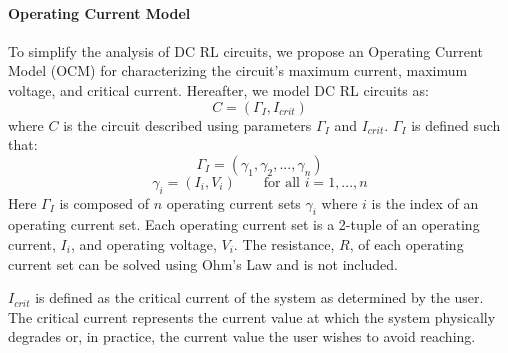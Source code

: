 \paragraph{Operating Current Model}
To simplify the analysis of DC RL circuits, we propose an Operating Current Model (OCM) for characterizing the circuit's maximum current, maximum voltage, and critical current.
Hereafter, we model DC RL circuits as:
\begin{equation}\label{eq:OCM}
C = (\Gamma_{I}, I_{crit})
\end{equation}
where $C$ is the circuit described using parameters $\Gamma_{I}$ and $I_{crit}$.
$\Gamma_{I}$ is defined such that:
\begin{equation}\label{eq:OCMTuples}
\Gamma_{I} = (\gamma_{1},\gamma_{2},...,\gamma_{n})
\end{equation}
\begin{equation}\label{eq:OCMIVPairs}
\gamma_{i} = (I_{i},V_{i})\qquad\text{for all  } i=1,...,n
\end{equation}
Here $\Gamma_{I}$ is composed of $n$ operating current sets $\gamma_{i}$ where $i$ is the index of an operating current set.
Each operating current set is a 2-tuple of an operating current, $I_{i}$, and operating voltage, $V_{i}$.
The resistance, $R$, of each operating current set can be solved using Ohm's Law and is not included.

$I_{crit}$ is defined as the critical current of the system as determined by the user.
The critical current represents the current value at which the system physically degrades or, in practice, the current value the user wishes to avoid reaching.

